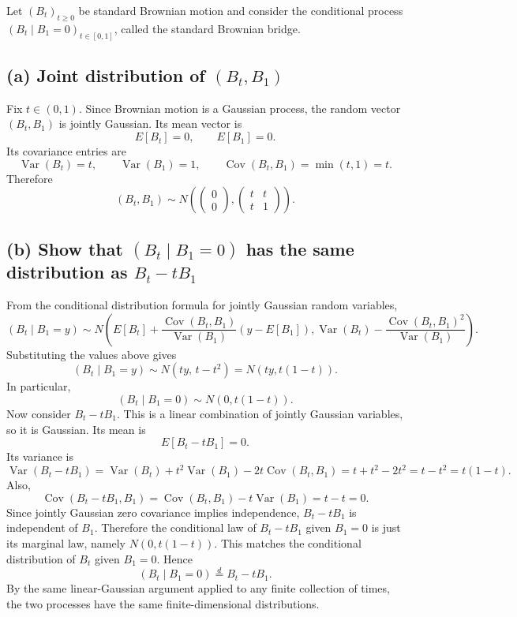 \documentclass[11pt]{article}
\begin{document}
Let $(B_t)_{t\ge0}$ be standard Brownian motion and consider the conditional process $(B_t\mid B_1=0)_{t\in[0,1]}$, called the standard Brownian bridge.

\subsection*{(a) Joint distribution of $(B_t,B_1)$}
Fix $t\in(0,1)$. Since Brownian motion is a Gaussian process, the random vector $(B_t,B_1)$ is jointly Gaussian. Its mean vector is
\[
E[B_t]=0,
\qquad
E[B_1]=0.
\]
Its covariance entries are
\[
\operatorname{Var}(B_t)=t,
\qquad
\operatorname{Var}(B_1)=1,
\qquad
\operatorname{Cov}(B_t,B_1)=\min(t,1)=t.
\]
Therefore
\[
(B_t,B_1)\sim N\left(
\begin{pmatrix}0\\0\end{pmatrix},
\begin{pmatrix}t&t\\ t&1\end{pmatrix}
\right).
\]

\subsection*{(b) Show that $(B_t\mid B_1=0)$ has the same distribution as $B_t-tB_1$}
From the conditional distribution formula for jointly Gaussian random variables,
\[
(B_t\mid B_1=y)\sim N\left(
E[B_t]+\frac{\operatorname{Cov}(B_t,B_1)}{\operatorname{Var}(B_1)}(y-E[B_1]),
\operatorname{Var}(B_t)-\frac{\operatorname{Cov}(B_t,B_1)^2}{\operatorname{Var}(B_1)}
\right).
\]
Substituting the values above gives
\[
(B_t\mid B_1=y)\sim N(ty,\,t-t^2)=N(ty,t(1-t)).
\]
In particular,
\[
(B_t\mid B_1=0)\sim N(0,t(1-t)).
\]
Now consider $B_t-tB_1$. This is a linear combination of jointly Gaussian variables, so it is Gaussian. Its mean is
\[
E[B_t-tB_1]=0.
\]
Its variance is
\[
\operatorname{Var}(B_t-tB_1)=\operatorname{Var}(B_t)+t^2\operatorname{Var}(B_1)-2t\operatorname{Cov}(B_t,B_1)
=t+t^2-2t^2=t-t^2=t(1-t).
\]
Also,
\[
\operatorname{Cov}(B_t-tB_1,B_1)=\operatorname{Cov}(B_t,B_1)-t\operatorname{Var}(B_1)=t-t=0.
\]
Since jointly Gaussian zero covariance implies independence, $B_t-tB_1$ is independent of $B_1$. Therefore the conditional law of $B_t-tB_1$ given $B_1=0$ is just its marginal law, namely $N(0,t(1-t))$. This matches the conditional distribution of $B_t$ given $B_1=0$. Hence
\[
(B_t\mid B_1=0)\overset{d}=B_t-tB_1.
\]
By the same linear-Gaussian argument applied to any finite collection of times, the two processes have the same finite-dimensional distributions.
\end{document}
